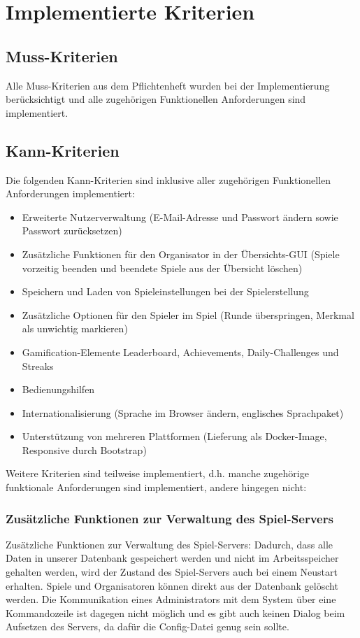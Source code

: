 \documentclass[a4paper]{scrreprt}
\begin{document}
\chapter{Implementierte Kriterien}

\section{Muss-Kriterien}
Alle Muss-Kriterien aus dem Pflichtenheft wurden bei der Implementierung berücksichtigt und alle zugehörigen Funktionellen Anforderungen sind implementiert.


\section{Kann-Kriterien}
Die folgenden Kann-Kriterien sind inklusive aller zugehörigen Funktionellen Anforderungen implementiert:

\begin{itemize}
\item Erweiterte Nutzerverwaltung (E-Mail-Adresse und Passwort ändern sowie Passwort zurücksetzen)
\item Zusätzliche Funktionen für den Organisator in der Übersichts-GUI (Spiele vorzeitig beenden und beendete Spiele aus der Übersicht löschen)
\item Speichern und Laden von Spieleinstellungen bei der Spielerstellung
\item Zusätzliche Optionen für den Spieler im Spiel (Runde überspringen, Merkmal als unwichtig markieren)
\item Gamification-Elemente Leaderboard, Achievements, Daily-Challenges und Streaks
\item Bedienungshilfen
\item Internationalisierung (Sprache im Browser ändern, englisches Sprachpaket)
\item Unterstützung von mehreren Plattformen (Lieferung als Docker-Image, Responsive durch Bootstrap)
\end{itemize}

\hspace{1cm}

Weitere Kriterien sind teilweise implementiert, d.h. manche zugehörige funktionale Anforderungen sind implementiert, andere hingegen nicht:

\subsection{Zusätzliche Funktionen zur Verwaltung des Spiel-Servers}
Zusätzliche Funktionen zur Verwaltung des Spiel-Servers: Dadurch, dass alle Daten in unserer Datenbank gespeichert werden und nicht im Arbeitsspeicher gehalten werden, wird der Zustand des Spiel-Servers auch bei einem Neustart erhalten. Spiele und Organisatoren können direkt aus der Datenbank gelöscht werden. Die Kommunikation eines Administrators mit dem System über eine Kommandozeile ist dagegen nicht möglich und es gibt auch keinen Dialog beim Aufsetzen des Servers, da dafür die Config-Datei genug sein sollte.  
\end{document}
